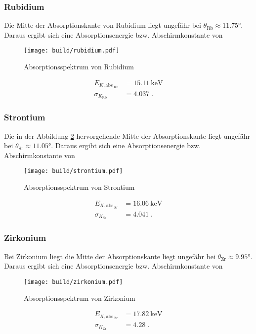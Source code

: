\subsubsection{Rubidium}
Die Mitte der Absorptionskante von Rubidium liegt ungefähr bei $\theta_\text{Rb} \approx \ang{11.75;;}$. Daraus ergibt sich eine Absorptionsenergie bzw. Abschirmkonstante von 
\begin{figure}
    \centering
    \caption{Absorptionsspektrum von Rubidium}
    \label{fig:Rubidium}
    \texttt{[image: build/rubidium.pdf]}
\end{figure}
\begin{align*}
    E_{K, \text{abs}_\text{ Rb}}  &= \SI{15.11}{\kilo\electronvolt} \\
    \sigma_{K_\text{Rb}}         &= \num{4.037} \; \text{.}
\end{align*}
\FloatBarrier
\subsubsection{Strontium}
Die in der Abbildung \ref{fig:Strontium} hervorgehende Mitte der Absorptionskante liegt ungefähr bei $\theta_\text{Sr} \approx \ang{11.05;;}$. 
Daraus ergibt sich eine Absorptionsenergie bzw. Abschirmkonstante von 
\begin{figure}
    \centering
    \caption{Absorptionsspektrum von Strontium}
    \label{fig:Strontium}
    \texttt{[image: build/strontium.pdf]}
\end{figure}
\begin{align*}
    E_{K, \text{abs}_\text{ Sr}}  &= \SI{16.06}{\kilo\electronvolt} \\
    \sigma_{K_\text{Sr}}         &= \num{4.041} \; \text{.}
\end{align*}
\FloatBarrier
\subsubsection{Zirkonium}
Bei Zirkonium liegt die Mitte der Absorptionskante liegt ungefähr bei $\theta_\text{Zr} \approx \ang{9.95;;}$. 
Daraus ergibt sich eine Absorptionsenergie bzw. Abschirmkonstante von 
\begin{figure}
    \centering
    \caption{Absorptionsspektrum von Zirkonium}
    \label{fig:Zirkonium}
    \texttt{[image: build/zirkonium.pdf]}
\end{figure}
\begin{align*}
    E_{K, \text{abs}_\text{ Zr}}  &= \SI{17.82}{\kilo\electronvolt} \\
    \sigma_{K_\text{Zr}}         &= \num{4.28} \; \text{.}
\end{align*}
\FloatBarrier
